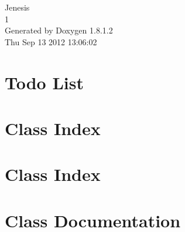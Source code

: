 \documentclass{book}
\begin{document}
\hypersetup{pageanchor=false,citecolor=blue}
\begin{titlepage}
\vspace*{7cm}
\begin{center}
{\Large Jenesis \\[1ex]\large 1 }\\
\vspace*{1cm}
{\large Generated by Doxygen 1.8.1.2}\\
\vspace*{0.5cm}
{\small Thu Sep 13 2012 13:06:02}\\
\end{center}
\end{titlepage}
\clearemptydoublepage
{}
\tableofcontents
\clearemptydoublepage
{}
\hypersetup{pageanchor=true,citecolor=blue}
\chapter{Todo List}
\label{todo}
\hypertarget{todo}{}

\chapter{Class Index}

\chapter{Class Index}

\chapter{Class Documentation}





















\printindex
\end{document}

